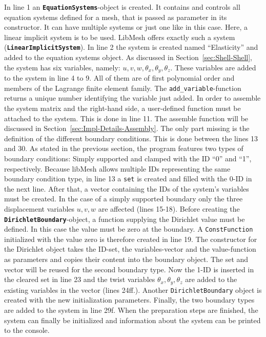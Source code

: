    In line 1 an \texttt{\textbf{EquationSystems}}-object is created. It contains and controls all equation systems defined for a mesh, that is passed as parameter in its constructor. It can have multiple systems or just one like in this case. Here, a linear implicit system is to be used. LibMesh offers exactly such a system (\texttt{\textbf{LinearImplicitSystem}}). In line 2 the system is created named ``Elasticity'' and added to the equation systems object. As discussed in Section~\ref{sec:Shell-Shell}, the system has six variables, namely: $u, v, w, \theta_x, \theta_y, \theta_z$. These variables are added to the system in line 4 to 9. All of them are of first polynomial order and members of the Lagrange finite element family. The \texttt{add\_variable}-function returns a unique number identifying the variable just added. In order to assemble the system matrix and the right-hand side, a user-defined function must be attached to the system. This is done in line 11. The assemble function will be discussed in Section~\ref{sec:Impl-Details-Assembly}. The only part missing is the definition of the different boundary conditions. This is done between the lines 13 and 30. As stated in the previous section, the program features two types of boundary conditions: Simply supported and clamped with the ID ``0'' and ``1'', respectively. Because libMesh allows multiple IDs representing the same boundary condition type, in line 13 a \texttt{set} is created and filled with the 0-ID in the next line. After that, a vector containing the IDs of the system's variables must be created. In the case of a simply supported boundary only the three displacement variables $u,v,w$ are affected (lines 15-18). Before creating the \texttt{\textbf{DirichletBoundary}}-object, a function supplying the Dirichlet value must be defined. In this case the value must be zero at the boundary. A \texttt{ConstFunction} initialized with the value zero is therefore created in line 19. The constructor for the Dirichlet object takes the ID-set, the variables-vector and the value-function as parameters and copies their content into the boundary object. The set and vector will be reused for the second boundary type. Now the 1-ID is inserted in the cleared set in line 23 and the twist variables $\theta_x, \theta_y, \theta_z$ are added to the existing variables in the vector (lines 24ff.). Another \texttt{DirichletBoundary} object is created with the new initialization parameters. Finally, the two boundary types are added to the system in line 29f. When the preparation steps are finished, the system can finally be initialized and information about the system can be printed to the console.
     

